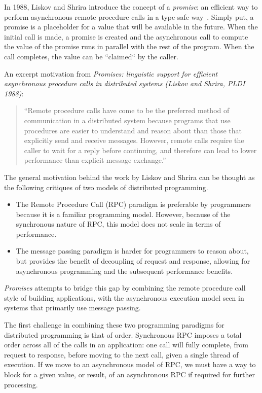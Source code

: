 In 1988, Liskov and Shrira introduce the concept of a \textit{promise}: an efficient way to perform asynchronous remote procedure calls in a type-safe way~\cite{liskov1988promises}.  Simply put, a promise is a placeholder for a value that will be available in the future.  When the initial call is made, a promise is created and the asynchronous call to compute the value of the promise runs in parallel with the rest of the program.  When the call completes, the value can be ``claimed`` by the caller.

An excerpt motivation from \textit{Promises: linguistic support for efficient asynchronous procedure calls in distributed systems (Liskov and Shrira, PLDI 1988)}:

\begin{quote}
``Remote procedure calls have come to be the preferred method of communication in a distributed system because programs that use procedures are easier to understand and reason about than those that explicitly send and receive messages. However, remote calls require the caller to wait for a reply before continuing, and therefore can lead to lower performance than explicit message exchange.''
\end{quote}

The general motivation behind the work by Liskov and Shrira can be thought as the following critiques of two models of distributed programming.
\begin{itemize}
	\item The Remote Procedure Call (RPC) paradigm is preferable by programmers because it is a familiar programming model.  However, because of the synchronous nature of RPC, this model does not scale in terms of performance.
	\item The message passing paradigm is harder for programmers to reason about, but provides the benefit of decoupling of request and response, allowing for asynchronous programming and the subsequent performance benefits.
\end{itemize}

\textit{Promises} attempts to bridge this gap by combining the remote procedure call style of building applications, with the asynchronous execution model seen in systems that primarily use  message passing.

The first challenge in combining these two programming paradigms for distributed programming is that of order.  Synchronous RPC imposes a total order across all of the calls in an application: one call will fully complete, from request to response, before moving to the next call, given a single thread of execution.  If we move to an asynchronous model of RPC, we must have a way to block for a given value, or result, of an asynchronous RPC if required for further processing.

